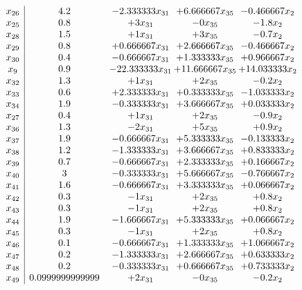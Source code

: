 \documentclass[11pt]{article}
\begin{document}
\[\begin{array}{c| c c@{\hskip 2pt} c@{\hskip 2pt} c@{\hskip 2pt} }
 x_{26}   &  4.2 & -2.333333 x_{31} & + 6.666667 x_{35} & -0.466667 x_{2}\\
 x_{25}   &  0.8 & + 3 x_{31} & -0 x_{35} & -1.8 x_{2}\\
 x_{28}   &  1.5 & + 1 x_{31} & + 3 x_{35} & -0.7 x_{2}\\
 x_{29}   &  0.8 & + 0.666667 x_{31} & + 2.666667 x_{35} & -0.466667 x_{2}\\
 x_{30}   &  0.4 & -0.666667 x_{31} & + 1.333333 x_{35} & + 0.966667 x_{2}\\
 x_{9}   &  0.9 & -22.333333 x_{31} & + 11.666667 x_{35} & + 14.033333 x_{2}\\
 x_{32}   &  1.3 & + 1 x_{31} & + 2 x_{35} & -0.2 x_{2}\\
 x_{33}   &  0.6 & + 2.333333 x_{31} & + 0.333333 x_{35} & -1.033333 x_{2}\\
 x_{34}   &  1.9 & -0.333333 x_{31} & + 3.666667 x_{35} & + 0.033333 x_{2}\\
 x_{27}   &  0.4 & + 1 x_{31} & + 2 x_{35} & -0.9 x_{2}\\
 x_{36}   &  1.3 & -2 x_{31} & + 5 x_{35} & + 0.9 x_{2}\\
 x_{37}   &  1.9 & -0.666667 x_{31} & + 5.333333 x_{35} & -0.133333 x_{2}\\
 x_{38}   &  1.2 & -1.333333 x_{31} & + 3.666667 x_{35} & + 0.833333 x_{2}\\
 x_{39}   &  0.7 & -0.666667 x_{31} & + 2.333333 x_{35} & + 0.166667 x_{2}\\
 x_{40}   &  3 & -0.333333 x_{31} & + 5.666667 x_{35} & -0.766667 x_{2}\\
 x_{41}   &  1.6 & -0.666667 x_{31} & + 3.333333 x_{35} & + 0.066667 x_{2}\\
 x_{42}   &  0.3 & -1 x_{31} & + 2 x_{35} & + 0.8 x_{2}\\
 x_{43}   &  0.3 & -1 x_{31} & + 2 x_{35} & + 0.8 x_{2}\\
 x_{44}   &  1.9 & -1.666667 x_{31} & + 5.333333 x_{35} & + 0.066667 x_{2}\\
 x_{45}   &  0.3 & -1 x_{31} & + 2 x_{35} & + 0.8 x_{2}\\
 x_{46}   &  0.1 & -0.666667 x_{31} & + 1.333333 x_{35} & + 1.066667 x_{2}\\
 x_{47}   &  0.2 & -1.333333 x_{31} & + 2.666667 x_{35} & + 0.633333 x_{2}\\
 x_{48}   &  0.2 & -0.333333 x_{31} & + 0.666667 x_{35} & + 0.733333 x_{2}\\
 x_{49}   &  0.0999999999999 & + 2 x_{31} & -0 x_{35} & -0.2 x_{2}\\

\end{array}\]
\end{document}
